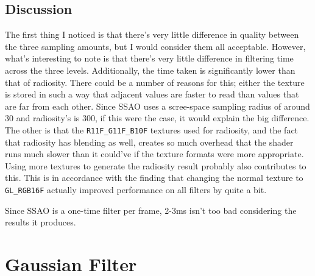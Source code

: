 \subsection{Discussion}
The first thing I noticed is that there's very little difference in quality between the three sampling amounts, but I would consider them all acceptable. However, what's interesting to note is that there's very little difference in filtering time across the three levels. Additionally, the time taken is significantly lower than that of radiosity. There could be a number of reasons for this; either the texture is stored in such a way that adjacent values are faster to read than values that are far from each other. Since SSAO uses a scree-space sampling radius of around 30 and radiosity's is 300, if this were the case, it would explain the big difference. The other is that the \verb=R11F_G11F_B10F= textures used for radiosity, and the fact that radiosity has blending as well, creates so much overhead that the shader runs much slower than it could've if the texture formats were more appropriate. Using more textures to generate the radiosity result probably also contributes to this. This is in accordance with the finding that changing the normal texture to \verb=GL_RGB16F= actually improved performance on all filters by quite a bit.

Since SSAO is a one-time filter per frame, 2-3ms isn't too bad considering the results it produces.

\section{Gaussian Filter}

